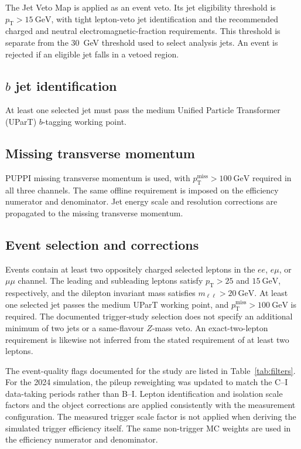The Jet Veto Map is applied as an event veto.
Its jet eligibility threshold is $p_{\mathrm T}>15~\mathrm{GeV}$, with tight lepton-veto jet identification and the recommended charged and neutral electromagnetic-fraction requirements.
This threshold is separate from the 30~GeV threshold used to select analysis jets.
An event is rejected if an eligible jet falls in a vetoed region.

\subsection{$b$ jet identification}\label{sec:btag}
At least one selected jet must pass the medium Unified Particle Transformer (UParT) $b$-tagging working point.

\subsection{Missing transverse momentum}\label{sec:met}
PUPPI missing transverse momentum is used, with $p_{\mathrm T}^{\mathrm{miss}}>100~\mathrm{GeV}$ required in all three channels.
The same offline requirement is imposed on the efficiency numerator and denominator.
Jet energy scale and resolution corrections are propagated to the missing transverse momentum.

\subsection{Event selection and corrections}\label{sec:events}
Events contain at least two oppositely charged selected leptons in the $ee$, $e\mu$, or $\mu\mu$ channel.
The leading and subleading leptons satisfy $p_{\mathrm T}>25$ and $15~\mathrm{GeV}$, respectively, and the dilepton invariant mass satisfies $m_{\ell\ell}>20~\mathrm{GeV}$.
At least one selected jet passes the medium UParT working point, and $p_{\mathrm T}^{\mathrm{miss}}>100~\mathrm{GeV}$ is required.
The documented trigger-study selection does not specify an additional minimum of two jets or a same-flavour $Z$-mass veto.
An exact-two-lepton requirement is likewise not inferred from the stated requirement of at least two leptons.

The event-quality flags documented for the study are listed in Table~\ref{tab:filters}.
For the 2024 simulation, the pileup reweighting was updated to match the C--I data-taking periods rather than B--I.
Lepton identification and isolation scale factors and the object corrections are applied consistently with the measurement configuration.
The measured trigger scale factor is not applied when deriving the simulated trigger efficiency itself.
The same non-trigger MC weights are used in the efficiency numerator and denominator.

